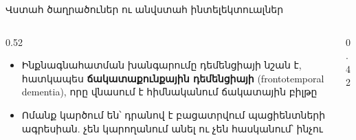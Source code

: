 \begin{frame}{Վստահ ծաղրածուներ ու անվստահ ինտելեկտուալներ}
  \begin{columns}[T]
    \begin{column}{0.52\textwidth}
      \begin{itemize}
        \item Ինքնագնահատման խանգարումը դեմենցիայի նշան է, հատկապես \textbf{ճակատաքունքային դեմենցիայի} (frontotemporal dementia), որը վնասում է հիմնականում ճակատային բիլթը
        \item<2-> Ոմանք կարծում են՝ դրանով է բացատրվում պացիենտների ագրեսիան. չեն կարողանում անել ու չեն հասկանում՝ ինչու
      \end{itemize}
    \end{column}
    \begin{column}{0.42\textwidth}
    \end{column}
  \end{columns}
\end{frame}
